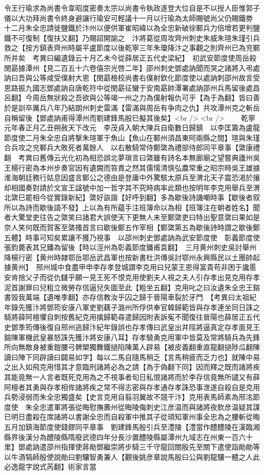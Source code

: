 令王行瑜求為尚書令韋昭度密奏太宗以尚書令執政遂登大位自是不以授人臣惟郭子儀以大功拜尚書令終身避讓行瑜安可輕議十一月以行瑜為太師賜號尚父仍賜鐵劵　十二月朱全忠請徙鹽鐵於汴州以便供軍崔昭緯以為全忠新破徐鄆兵力倍增若更判鹽鐵不可復制【復扶又翻】乃賜詔開諭之　汴將葛從周攻齊州刺史朱威朱瑄朱瑾引兵救之【按方鎮表齊州時屬平盧節度以後乾寧三年朱瓊降汴之事觀之則齊州已為兖鄆所并矣　考異曰編遺錄云十月乙未今從薛居正五代史梁紀】　初武安節度使周岳殺閔勗據潭州【見二百五十六卷僖宗光啓二年】邵州刺史鄧處訥聞而哭之諸將入弔處訥曰吾與公等咸受僕射大恩【閔勗檢校尚書右僕射欽化節度使以處訥刺邵州故言受恩路振九國志鄧處訥自唐乾符中從閔勗征蠻于安南勗帥潭署處訥邵州兵馬留後處昌呂翻】今周岳無狀殺之吾欲與公等竭一州之力為僕射報仇可乎【為于為翻】皆曰善於是訓卒厲兵八年乃結朗州刺史雷滿【雷滿與周岳有争肉之仇】共攻潭州克之斬岳自稱留後【鄧處訥甫得潭州而劉建鋒馬殷巳擬其後矣】<br />
<br />
　　乾寧元年春正月乙丑朔赦天下改元　李茂貞入朝大陳兵自衛數日歸鎮　以李匡籌為盧龍節度使二月朱全忠自將撃朱瑄軍于魚山【魚山在鄆州須昌東阿兩縣之間】瑄與朱瑾合兵攻之兖鄆兵大敗死者萬餘人　以右散騎常侍鄭綮為禮部侍郎同平章事【綮康禮翻　考異曰舊傳云光化初為相恐誤北夢瑣言曰綮雖有詩名本無廊廟之望嘗典廬州吳王楊行密為本州步奏官因有遺闕而笞責之然其儒懦清慎弘農常重之昭宗時吳王雄據淮海朝廷務行姑息因盛言鄭公之德由是登庸中外驚駭太原兵至渭北天子震恐渇於攘却相國奏對請於文宣王諡號中加一哲字其不究時病率此類也按明年李克用舉兵至渭北綮巳罷相今從實錄新紀】綮好詼諧【好呼到翻】多為歇後詩譏嘲時事【歇後者叙所以為詩而歇後語不發】上以為有所藴手注班簿命以為相【班簿注在朝者姓名】聞者大驚堂吏往告之綮笑曰諸君大誤使天下更無人未至鄭綮吏曰特出聖意綮曰果如是奈人笑何既而賀客至綮搔首言曰歇後鄭五作宰相【鄭綮第五為歇後詩時謂之歇後鄭五體】時事可知矣累讓不獲乃視事　以邵州刺史鄧處訥為武安節度使　彰義節度使張鈞薨表其兄鐇為留後【時以涇州為彰義節度鐇甫袁翻】　三月黄州刺史吳討舉州降楊行密【黄州時隷鄂岳鄂岳武昌軍也按新書杜洪傳吳討鄂州永興縣民以土團帥起據黄州】　邢州城中食盡甲申李存孝登城謂李克用曰兒蒙王恩得富貴苟非困于讒慝安肯捨父子而從仇讎乎願一見王死不恨克用使劉夫人視之夫人引存孝出見克用存孝泥首謝罪曰兒粗立微勞存信逼兒失圖至此【粗坐五翻】克用叱之曰汝遺朱全忠王鎔書毁我萬端【遺唯季翻】亦存信教汝乎囚之歸于晉陽車裂於牙門　【考異曰太祖紀年錄先獲汴將鄧筠安康八軍吏劉藕子潞州所俘供奉官韓歸範皆與存孝連坐同日誅之騎將薛阿檀懼自刺按舊紀克用擒歸範尋遣歸因附表訴寃不聞復往晉陽也薛居正五代史鄧季筠傳後復自邢州逃歸汴紀年錄誤也存孝傳曰武皇出井陘將逼真定存孝面見王鎔陳軍機武皇暴怒誅先獲汴將安康八耳】存孝驍勇克用軍中皆莫及常將騎兵為先鋒所向無敵身被重鎧腰弓髀槊獨舞鐵撾陷陳萬人辟易【被皮義翻重直龍翻撾陟瓜翻陳讀曰陣下同辟讀曰闢易如字】每以二馬自隨馬稍乏【言馬稍疲而乏力也】就陳中易之出入如飛克用惜其才意臨刑諸將必為之請【為于偽翻下同】因而釋之既而諸將疾其能竟無一人言者既死克用為之不視事者旬日私恨諸將而於李存信竟無所譴又有薛阿檀者其勇與存孝相侔諸將疾之常不得志密與存孝通存孝誅恐事泄遂自殺自是克用兵勢浸弱而朱全忠獨盛矣【史言克用自翦羽翼故不競干汴】克用表馬師素為邢洺節度使　朱全忠遣軍將張從晦慰撫夀州從晦陵侮刺史江彦温而與諸將夜飲彦温疑其謀已明日盡殺在席諸將以書謝全忠而自殺軍中推其子從頊知軍州事全忠為之腰斬從晦　五月加鎮海節度使錢鏐同平章事　劉建鋒馬殷引兵至澧陵【澧當作醴醴陵在漢臨湘縣界後漢分為醴陵縣隋廢武德四年分長沙置醴陵縣屬潭州九域志在州東一百六十里】鄧處訥遣邵州指揮使蔣勛鄧繼崇將步騎三千守龍回關殷先至關下遣使詣勛勛等以牛酒犒師殷使說勛曰劉驤智勇兼人【觀後姚彦章說馬殷曰公與劉龍驤一體之人此必逸龍字說式芮翻】術家言當